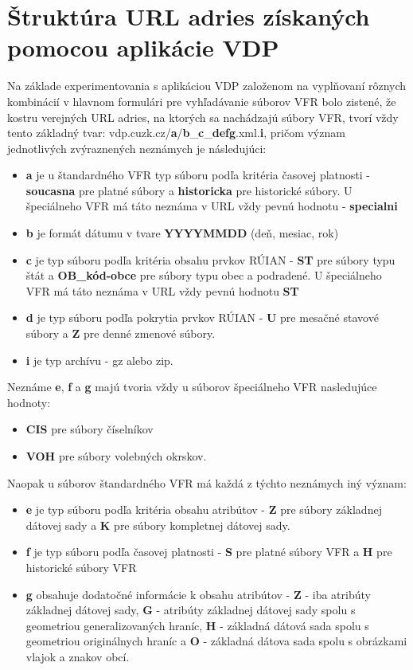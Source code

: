 \section{Štruktúra URL adries získaných pomocou aplikácie VDP}
\label{urlstruct}
Na základe experimentovania s aplikáciou VDP založenom na vyplňovaní rôznych kombinácií v hlavnom formulári pre vyhľadávanie súborov VFR bolo zistené, že kostru verejných URL adries, na ktorých sa nachádzajú súbory VFR, tvorí vždy tento základný tvar: vdp.cuzk.cz/{\bf a}/{\bf b}\_{\bf c}\_{\bf defg}.xml.{\bf i}, pričom význam jednotlivých zvýraznených neznámych je následujúci:
\begin{itemize}
\item{{\bf a} je u štandardného VFR typ súboru podľa kritéria časovej platnosti - {\bf soucasna} pre platné súbory a {\bf historicka} pre historické súbory. 
U špeciálneho VFR má táto neznáma v URL vždy pevnú hodnotu - {\bf specialni}}
\item{{\bf b} je formát dátumu v tvare {\bf YYYYMMDD} (deň, mesiac, rok)}
\item{{\bf c} je typ súboru podľa kritéria obsahu prvkov RÚIAN - {\bf ST} pre súbory typu štát  a {\bf OB\_kód-obce} pre súbory typu obec a podradené. U špeciálneho VFR má táto neznáma v URL vždy pevnú hodnotu {\bf ST}}
\item{{\bf d} je typ súboru podľa pokrytia prvkov RÚIAN - {\bf U} pre mesačné stavové súbory a {\bf Z} pre denné zmenové súbory.}
\item{\bf i} je typ archívu - gz alebo zip.
\end{itemize}
Neznáme {\bf e}, {\bf f} a {\bf g} majú tvoria vždy u súborov špeciálneho VFR nasledujúce hodnoty:
\begin{itemize}
    \item {{\bf CIS} pre súbory číselníkov}
    \item{{\bf VOH} pre súbory volebných okrskov.}
\end{itemize}
Naopak u súborov štandardného VFR má každá z týchto neznámych iný význam:
\begin{itemize}
    \item {{\bf e} je typ súboru podľa kritéria obsahu atribútov - {\bf Z} pre súbory základnej dátovej sady a {\bf K} pre súbory kompletnej dátovej sady.}
    \item{{\bf f} je typ súboru podľa časovej platnosti - {\bf S} pre platné súbory VFR a {\bf H} pre historické súbory VFR}
    \item {{\bf g} obsahuje dodatočné informácie k obsahu atribútov - {\bf Z} - iba atribúty základnej dátovej sady, {\bf G} - atribúty základnej dátovej sady spolu s geometriou generalizovaných hraníc, {\bf H} - základná dátová sada spolu s geometriou originálnych hraníc a {\bf O} - základná dátova sada spolu s obrázkami vlajok a znakov obcí.}
\end{itemize}
